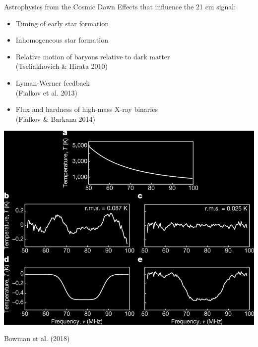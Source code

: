 \documentclass{beamer}
\begin{document}
\begin{frame}{Astrophysics from the Cosmic Dawn}
    Effects that influence the 21 cm signal:
    \begin{itemize}[label=\textbullet]
        \item Timing of early star formation
        \item Inhomogeneous star formation
        \item Relative motion of baryons relative to dark matter\\
            {\tiny(Tseliakhovich \& Hirata 2010)}
        \item Lyman-Werner feedback\\
            {\tiny(Fialkov et al. 2013)}
        \item Flux and hardness of high-mass X-ray binaries\\
            {\tiny(Fialkov \& Barkana 2014)}
    \end{itemize}
\end{frame}

\begin{frame}
    \begin{center}
        \includegraphics[height=0.9\textheight]{figures/bowman-2018-absorption-trough.jpg}
    \end{center}
    \begin{center}
        \tiny{Bowman et al. (2018)}
    \end{center}
\end{frame}
\end{document}
